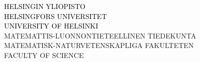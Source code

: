 \documentclass[portrait,a0]{a0poster}
\begin{document}
\vspace{-17cm}
\begin{minipage}[t]{.98\linewidth} %
\vspace{0pt} %
\begin{flushright}
\begin{spacing}{5}
{\Huge{}\textcolor{black}{\MakeUppercase{Helsingin Yliopisto}} \MakeUppercase{}}\\
{\Huge{}\textcolor{black}{\MakeUppercase{Helsingfors Universitet}} \MakeUppercase{}}\\
{\Huge{}\textcolor{black}{\MakeUppercase{University of Helsinki}} \MakeUppercase{}}\\
{\Huge{}\textcolor{facultyColor}{\MakeUppercase{Matemattis-Luonnontieteellinen tiedekunta}} \MakeUppercase{}}\\
{\Huge{}\textcolor{facultyColor}{\MakeUppercase{Matematisk-Naturvetenskapliga fakulteten}} \MakeUppercase{}}\\
{\Huge{}\textcolor{facultyColor}{\MakeUppercase{Faculty of Science}} \MakeUppercase{}}\\
\end{spacing}
\end{flushright}
\hspace{50pt}

\end{minipage} %


\end{document}
